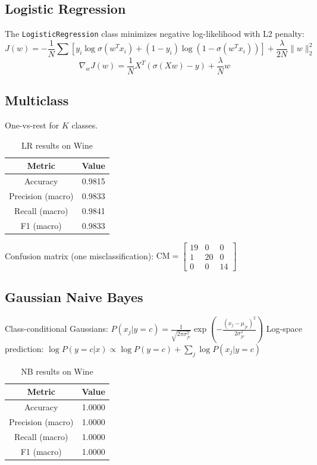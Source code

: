 \documentclass[12pt]{article}
\begin{document}
\subsection{Logistic Regression}
The \texttt{LogisticRegression} class minimizes negative log-likelihood with L2 penalty:
\begin{equation}
J(w) = -\frac{1}{N}\sum [y_i\log\sigma(w^T x_i) + (1-y_i)\log(1-\sigma(w^T x_i))] + \frac{\lambda}{2N}\|w\|_2^2
\end{equation}
\begin{equation}
\nabla_w J(w) = \frac{1}{N}X^T(\sigma(Xw)-y) + \frac{\lambda}{N}w
\end{equation}

\subsection{Multiclass}
One-vs-rest for $K$ classes.

\begin{table}[H]
    \centering
    \caption{LR results on Wine}
    \begin{tabular}{c c}
        \toprule
        Metric & Value \\
        \midrule
        Accuracy & 0.9815 \\
        Precision (macro) & 0.9833 \\
        Recall (macro) & 0.9841 \\
        F1 (macro) & 0.9833 \\
        \bottomrule
    \end{tabular}
    \label{tab:lr_wine}
\end{table}

Confusion matrix (one misclassification):
$\text{CM} = \begin{bmatrix}19&0&0\\1&20&0\\0&0&14\end{bmatrix}$

\subsection{Gaussian Naive Bayes}
Class-conditional Gaussians:
$P(x_j|y=c) = \frac{1}{\sqrt{2\pi\sigma_{jc}^2}}\exp(-\frac{(x_j-\mu_{jc})^2}{2\sigma_{jc}^2})$
Log-space prediction:
$\log P(y=c|x) \propto \log P(y=c) + \sum_j \log P(x_j|y=c)$

\begin{table}[H]
    \centering
    \caption{NB results on Wine}
    \begin{tabular}{c c}
        \toprule
        Metric & Value \\
        \midrule
        Accuracy & 1.0000 \\
        Precision (macro) & 1.0000 \\
        Recall (macro) & 1.0000 \\
        F1 (macro) & 1.0000 \\
        \bottomrule
    \end{tabular}
    \label{tab:nb_wine}
\end{table}
\end{document}
